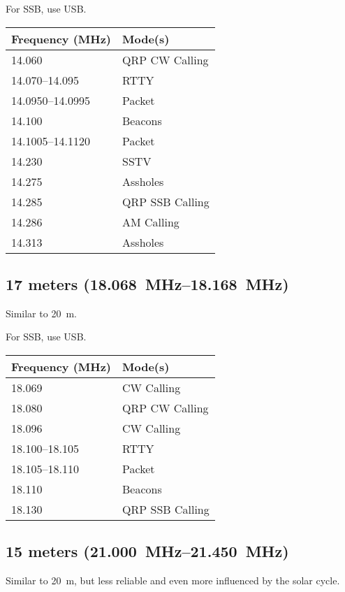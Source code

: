 \documentclass[11pt, onecolumn, table]{article}
\begin{document}
For SSB, use USB.
\begin{center}
  \begin{tabular}{l l}
    {Frequency (\si{\MHz})}		& Mode(s)			\\
    \midrule
    \num{14.060}				& QRP CW Calling	\\
    \numrange{14.070}{14.095}	& RTTY				\\
    \numrange{14.0950}{14.0995}	& Packet			\\
    \num{14.100}				& Beacons			\\
    \numrange{14.1005}{14.1120}	& Packet			\\
    \num{14.230}				& SSTV				\\
    \num{14.275}				& Assholes			\\
    \num{14.285}				& QRP SSB Calling	\\
    \num{14.286}				& AM Calling		\\
    \num{14.313}				& Assholes			\\
  \end{tabular}
\end{center}


\newpage
\subsection{17 meters (\SIrange{18.068}{18.168}{\MHz})}
Similar to \SI{20}{m}.

For SSB, use USB.
\begin{center}
  \begin{tabular}{l l}
    {Frequency (\si{\MHz})}			& Mode(s)			\\
    \midrule
    \num{18.069}					& CW Calling		\\
    \num{18.080}					& QRP CW Calling	\\
    \num{18.096}					& CW Calling		\\
    \numrange{18.100}{18.105}		& RTTY				\\
    \numrange{18.105}{18.110}		& Packet			\\
    \num{18.110}					& Beacons			\\
    \num{18.130}					& QRP SSB Calling	\\
  \end{tabular}
\end{center}


\subsection{15 meters (\SIrange{21.000}{21.450}{\MHz})}
Similar to \SI{20}{m}, but less reliable and even more influenced
by the solar cycle.
\end{document}
